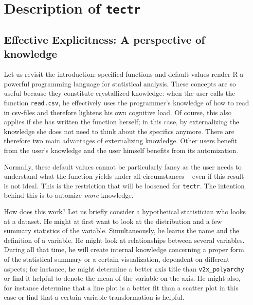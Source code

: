 \documentclass[]{report}
\theoremstyle{definition}
\theoremstyle{definition}
\theoremstyle{definition}
\theoremstyle{remark}
\begin{document}
\hypertarget{concept}{\chapter{\texorpdfstring{Description of
\texttt{tectr}}{Description of tectr}}\label{concept}}

\section{Effective Explicitness: A perspective of
knowledge}\label{effective-explicitness-a-perspective-of-knowledge}

Let us revisit the introduction: specified functions and default values
render R a powerful programming language for statistical analysis. These
concepts are so useful because they constitute crystallized knowledge:
when the user calls the function \texttt{read.csv}, he effectively uses
the programmer's knowledge of how to read in csv-files and therefore
lightens his own cognitive load. Of course, this also applies if she has
written the function herself; in this case, by externalizing the
knowledge she does not need to think about the specifics anymore. There
are therefore two main advantages of externalizing knowledge. Other
users benefit from the user's knowledge and the user himself benefits
from its automization.

Normally, these default values cannot be particularly fancy as the user
needs to understand what the function yields under all circumstances --
even if this result is not ideal. This is the restriction that will be
loosened for \texttt{tectr}. The intention behind this is to automize
\emph{more} knowledge.

How does this work? Let us briefly consider a hypothetical statistician
who looks at a dataset. He might at first want to look at the
distribution and a few summary statistics of the variable.
Simultaneously, he learns the name and the definition of a variable. He
might look at relationships between several variables. During all that
time, he will create internal knowledge concerning a proper form of the
statistical summary or a certain visualization, dependent on different
aspects; for instance, he might determine a better axis title than
\texttt{v2x\_polyarchy} or find it helpful to denote the mean of the
variable on the axis. He might also, for instance determine that a line
plot is a better fit than a scatter plot in this case or find that a
certain variable transformation is helpful.
\end{document}
